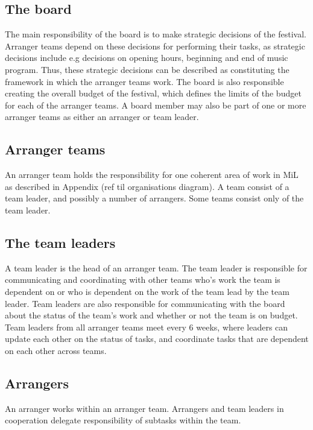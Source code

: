 \subsection{The board}
\label{sub:the_board}
The main responsibility of the board is to make strategic decisions of the festival. Arranger teams depend on these decisions for performing their tasks, as strategic decisions include e.g decisions on opening hours, beginning and end of music program. Thus, these strategic decisions can be described as constituting the framework in which the arranger teams work. The board is also responsible creating the overall budget of the festival, which defines the limits of the budget for each of the arranger teams. A board member may also be part of one or more arranger teams as either an arranger or team leader.

\subsection{Arranger teams} %
\label{sub:arranger_team}
An arranger team holds the responsibility for one coherent area of work in MiL as described in Appendix (ref til organisations diagram). A team consist of a team leader, and possibly a number of arrangers. Some teams consist only of the team leader.

\subsection{The team leaders}
\label{sub:team_leaders}
A team leader is the head of an arranger team. The team leader is responsible for communicating and coordinating with other teams who's work the team is dependent on or who is dependent on the work of the team lead by the team leader. Team leaders are also responsible for communicating with the board about the status of the team's work and whether or not the team is on budget. Team leaders from all arranger teams meet every 6 weeks, where leaders can update each other on the status of tasks, and coordinate tasks that are dependent on each other across teams.

\subsection{Arrangers}
\label{sub:team_members}
An arranger works within an arranger team. Arrangers and team leaders in cooperation delegate responsibility of subtasks within the team.

